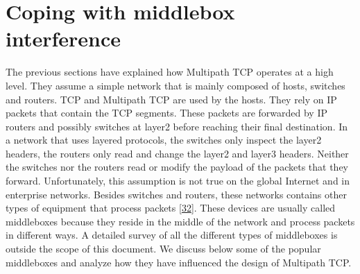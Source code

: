 \documentclass[letterpaper,10pt,english]{sphinxmanual}
\begin{document}
\section{Coping with middlebox interference}
\label{\detokenize{mptcp:coping-with-middlebox-interference}}\label{\detokenize{mptcp:mptcp-middlebox}}
\sphinxAtStartPar
The previous sections have explained how Multipath TCP operates at a high level. They assume a simple network that is mainly composed of hosts, switches and routers. TCP and Multipath TCP are used by the hosts. They rely on IP packets that contain the TCP segments. These packets are forwarded by IP routers and possibly switches at layer\sphinxhyphen{}2 before reaching their final destination. In a network that uses layered protocols, the switches only inspect the layer\sphinxhyphen{}2 headers, the routers only read and change the layer\sphinxhyphen{}2 and layer\sphinxhyphen{}3 headers. Neither the switches nor the routers read or modify the payload of the packets that they forward. Unfortunately, this assumption is not true on the global Internet and in enterprise networks. Besides switches and routers, these networks contains other types of equipment that process packets {[}\hyperlink{cite.biblio:id8916}{32}{]}. These devices are usually called middleboxes because they reside in the middle of the network and process packets in different ways. A detailed survey of all the different types of middleboxes is outside the scope of this document. We discuss below some of the popular middleboxes and analyze how they have influenced the design of Multipath TCP.
\end{document}
